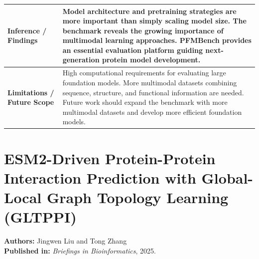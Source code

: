 \documentclass[12pt,a4paper]{report}
\begin{document}
\newpage

\begin{table}[H]
\centering
\renewcommand{\arraystretch}{1.5}
\begin{tabular}{|p{}|p{}|}
\hline
\textbf{Inference / Findings} & Model architecture and pretraining strategies are more important than simply scaling model size. The benchmark reveals the growing importance of multimodal learning approaches. PFMBench provides an essential evaluation platform guiding next-generation protein model development. \\ \hline
\textbf{Limitations / Future Scope} & High computational requirements for evaluating large foundation models. More multimodal datasets combining sequence, structure, and functional information are needed. Future work should expand the benchmark with more multimodal datasets and develop more efficient foundation models. \\ \hline
\end{tabular}
\end{table}

\newpage

\section{ESM2-Driven Protein-Protein Interaction Prediction with Global-Local Graph Topology Learning (GLTPPI)}
\textbf{Authors:} Jingwen Liu and Tong Zhang \\
\textbf{Published in:} \textit{Briefings in Bioinformatics}, 2025.
\end{document}
